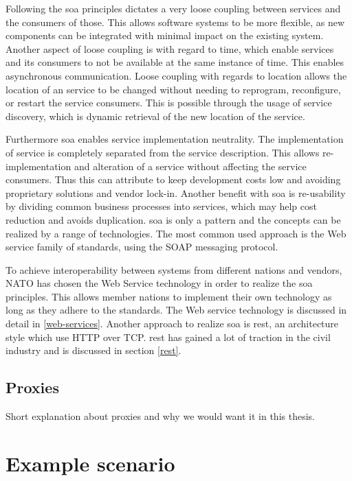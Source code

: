Following the \gls{soa} principles dictates a very loose coupling between
services and the consumers of those. This allows software systems to be more
flexible, as new components can be integrated with minimal impact on the
existing system. Another aspect of loose coupling is with regard to time, which
enable services and its consumers to not be available at the same instance of
time. This enables asynchronous communication. Loose coupling with regards to
location allows the location of an service to be changed without needing to
reprogram, reconfigure, or restart the service consumers. This is possible
through the usage of service discovery, which is dynamic retrieval of the
new location of the service.

Furthermore \gls{soa} enables service implementation neutrality. The
implementation of service is completely separated from the service
description. This allows re-implementation and alteration of a service without
affecting the service consumers. Thus this can attribute to keep development
costs low and avoiding proprietary solutions and vendor lock-in. Another
benefit with \gls{soa} is re-usability by dividing common business processes
into services, which may help cost reduction and avoids duplication. \gls{soa}
is only a pattern and the concepts can be realized by a range of technologies.
The most common used approach is the Web service family of standards, using
the SOAP messaging protocol.

To achieve interoperability between systems from different nations and
vendors, NATO has chosen the Web Service technology in order to realize the
\gls{soa}  principles\cite{soa-baseline}. This allows member nations to
implement their own technology as long as they adhere to the standards. The
Web service technology is discussed in detail in \cref{web-services}. Another
approach to realize \gls{soa} is \gls{rest}, an architecture style which use
HTTP over TCP. \gls{rest} has gained a lot of traction in the civil industry
and is discussed in section \cref{rest}.


\subsection{Proxies}

Short explanation about proxies and why we would want it in this thesis.


\section{Example scenario}

